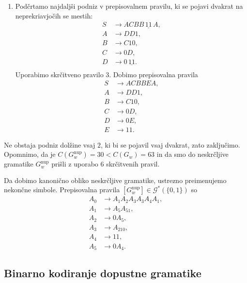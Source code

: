 \documentclass[fin1, tisk]{fmfdelo}
\newcommand{\G}{\mathcal{G}}
\theoremstyle{definition}
\begin{document}
\begin{primer}
\begin{enumerate}
        \item Podčrtamo najdaljši podniz v prepisovalnem pravilu, ki se pojavi
        dvakrat na neprekriavjočih se mestih:
        \begin{align*}
            S &\rightarrow ACBB \, \underline{11} \, A, \\
            A &\rightarrow DD1, \\
            B &\rightarrow C10, \\
            C &\rightarrow 0D, \\
            D &\rightarrow 0 \, \underline{11}. \\
        \end{align*}
        Uporabimo skrčitveno pravilo $3$. Dobimo prepisovalna pravila
        \begin{align*}
            S &\rightarrow ACBBEA, \\
            A &\rightarrow DD1, \\
            B &\rightarrow C10, \\
            C &\rightarrow 0D, \\
            D &\rightarrow 0E, \\
            E &\rightarrow 11.
        \end{align*}
    \end{enumerate}
    Ne obstaja podniz dolžine vsaj $2$, ki bi se pojavil vsaj dvakrat, zato zaključimo.
    Opomnimo, da je $C(G^\text{nup}_w) = 30 < C(G_w) = 63$ in da smo do neskrčljive gramatike
    $G^\text{nup}_w$ prišli z uporabo $6$ skrčitvenih pravil.

    Da dobimo kanonično obliko neskrčljive gramatike, ustrezno preimenujemo
    nekončne simbole. Prepisovalna pravila $[G^\text{nup}_w] \in \G^*(\{ 0, 1 \})$ so
    \begin{align*}
        A_0 &\rightarrow A_1A_2A_3A_3A_4A_1, \\
        A_1 &\rightarrow A_5A_51, \\
        A_2 &\rightarrow 0A_5, \\
        A_3 &\rightarrow A_210, \\
        A_4 &\rightarrow 11, \\
        A_5 &\rightarrow 0A_4.
    \end{align*}
\end{primer}

\subsection{Binarno kodiranje dopustne gramatike}
\end{document}
